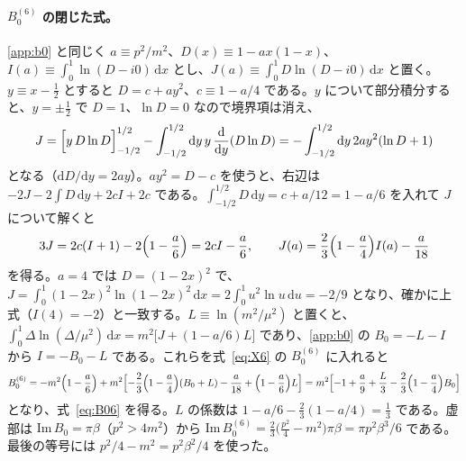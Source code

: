 \documentclass[a4paper,10pt]{ltjsarticle}
\newcommand{\dd}{\mathrm{d}}
\begin{document}
\paragraph{$B_0^{(6)}$ の閉じた式。}\ref{app:b0} と同じく $a\equiv p^2/m^2$、$D(x)\equiv1-ax(1-x)$、$I(a)\equiv\int_0^1\ln(D-i0)\,\dd x$ とし、$J(a)\equiv\int_0^1D\ln(D-i0)\,\dd x$ と置く。$y\equiv x-\tfrac12$ とすると $D=c+ay^2$、$c\equiv1-a/4$ である。$y$ について部分積分すると、$y=\pm\tfrac12$ で $D=1$、$\ln D=0$ なので境界項は消え、
\begin{equation*}
J=\Bigl[y\,D\ln D\Bigr]_{-1/2}^{1/2}-\int_{-1/2}^{1/2}\dd y\,y\,\frac{\dd}{\dd y}(D\ln D)=-\int_{-1/2}^{1/2}\dd y\,2ay^2(\ln D+1)
\end{equation*}
となる（$\dd D/\dd y=2ay$）。$ay^2=D-c$ を使うと、右辺は $-2J-2\int D\,\dd y+2cI+2c$ である。$\int_{-1/2}^{1/2}D\,\dd y=c+a/12=1-a/6$ を入れて $J$ について解くと
\begin{equation*}
3J=2c(I+1)-2\Bigl(1-\frac a6\Bigr)=2cI-\frac a6,\qquad J(a)=\frac23\Bigl(1-\frac a4\Bigr)I(a)-\frac{a}{18}
\end{equation*}
を得る。$a=4$ では $D=(1-2x)^2$ で、$J=\int_0^1(1-2x)^2\ln(1-2x)^2\,\dd x=2\int_0^1u^2\ln u\,\dd u=-2/9$ となり、確かに上式（$I(4)=-2$）と一致する。$L\equiv\ln(m^2/\mu^2)$ と置くと、$\int_0^1\Delta\ln(\Delta/\mu^2)\,\dd x=m^2\bigl[J+(1-a/6)L\bigr]$ であり、\ref{app:b0} の $B_0=-L-I$ から $I=-B_0-L$ である。これらを式~\eqref{eq:X6} の $B_0^{(6)}$ に入れると
\begin{equation*}
B_0^{(6)}=-m^2\Bigl(1-\frac a6\Bigr)+m^2\Bigl[-\frac23\Bigl(1-\frac a4\Bigr)(B_0+L)-\frac a{18}+\Bigl(1-\frac a6\Bigr)L\Bigr]
=m^2\Bigl[-1+\frac a9+\frac L3-\frac23\Bigl(1-\frac a4\Bigr)B_0\Bigr]
\end{equation*}
となり、式~\eqref{eq:B06} を得る。$L$ の係数は $1-a/6-\tfrac23(1-a/4)=\tfrac13$ である。虚部は $\mathrm{Im}\,B_0=\pi\beta$（$p^2>4m^2$）から $\mathrm{Im}\,B_0^{(6)}=\tfrac23\bigl(\tfrac{p^2}{4}-m^2\bigr)\pi\beta=\pi p^2\beta^3/6$ である。最後の等号には $p^2/4-m^2=p^2\beta^2/4$ を使った。
\end{document}
